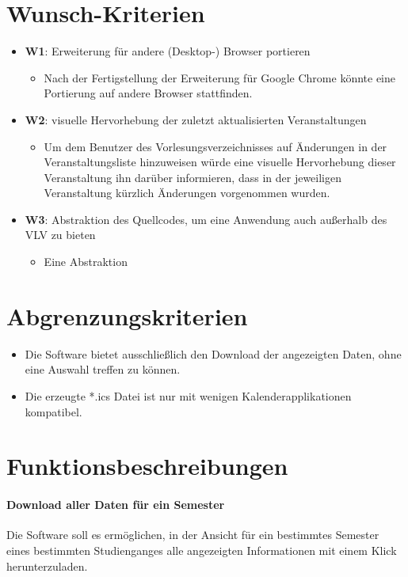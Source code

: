 \documentclass[11pt]{scrreprt}
\begin{document}
\section{Wunsch-Kriterien}
\begin{itemize}
\item \textbf{W1}: Erweiterung für andere (Desktop-) Browser portieren
    \begin{itemize}
    \item Nach der Fertigstellung der Erweiterung für Google Chrome könnte eine Portierung auf andere Browser stattfinden.
    \end{itemize}
\item \textbf{W2}: visuelle Hervorhebung der zuletzt aktualisierten Veranstaltungen
    \begin{itemize}
    \item Um dem Benutzer des Vorlesungsverzeichnisses auf \"Anderungen in der Veranstaltungsliste hinzuweisen würde eine visuelle Hervorhebung dieser Veranstaltung ihn darüber informieren, dass in der jeweiligen Veranstaltung k\"urzlich \"Anderungen vorgenommen wurden.
    \end{itemize}
\item \textbf{W3}: Abstraktion des Quellcodes, um eine Anwendung auch außerhalb des VLV zu bieten
    \begin{itemize}
    \item Eine Abstraktion
    \end{itemize}
\end{itemize}

\section{Abgrenzungskriterien}
\begin{itemize}
\item Die Software bietet ausschließlich den Download der angezeigten Daten, ohne eine Auswahl treffen zu k\"onnen.
\item Die erzeugte *.ics Datei ist nur mit wenigen Kalenderapplikationen kompatibel.
\end{itemize}

\section{Funktionsbeschreibungen}
\paragraph{Download aller Daten für ein Semester}
Die Software soll es ermöglichen, in der Ansicht für ein bestimmtes Semester eines bestimmten Studienganges alle angezeigten Informationen mit einem Klick herunterzuladen.
\end{document}
